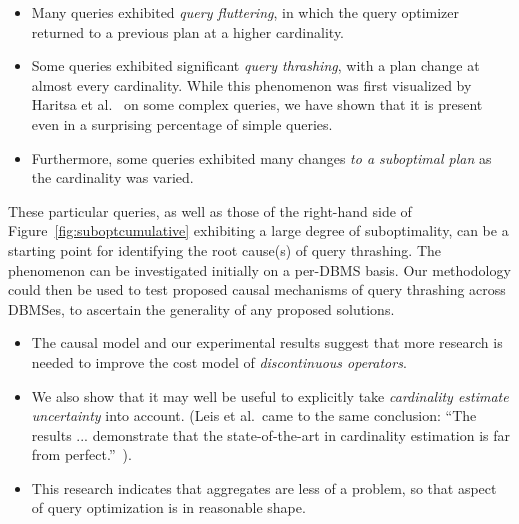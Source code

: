 \documentclass[prodmode,acmtods]{acmsmall}
\begin{document}
\begin{itemize}

\item Many queries exhibited {\em query fluttering}, in which the query
  optimizer returned to a previous plan at a higher cardinality.
\item Some queries exhibited significant {\em query thrashing}, with a plan change at
         almost every cardinality. While this phenomenon was first visualized
         by Haritsa et al.~\cite{harish07,Haritsa10} on some complex
         queries, we have shown that it is present even in a surprising
         percentage of simple queries.

\item Furthermore, some queries exhibited many changes
{\em to a suboptimal plan} as the \hbox{cardinality} was varied.
\end{itemize}
\noindent
These particular queries, as well as those of the right-hand side of
Figure~\ref{fig:suboptcumulative} exhibiting a large degree of suboptimality, can be a starting point for identifying the root
cause(s) of query thrashing. The phenomenon can be investigated initially on a
per-DBMS basis. Our methodology could then be
used to test proposed causal mechanisms of query thrashing across \hbox{DBMSes}, to
ascertain the generality of any proposed solutions.

\begin{itemize}
\item The causal model and our experimental results suggest that more
research is needed to improve the cost model of {\em discontinuous
operators}.

\item We also show that it may well be useful to explicitly take {\em \hbox{cardinality} estimate
  uncertainty} into account. (Leis et al.~came
  to the same conclusion: ``The results ... demonstrate that the
  state-of-the-art in cardinality estimation is far from
  perfect.''~\cite{Leis15}).

\item This research indicates that aggregates are less of a problem, so
  that aspect of query optimization is in reasonable shape.

\end{itemize}
\end{document}
